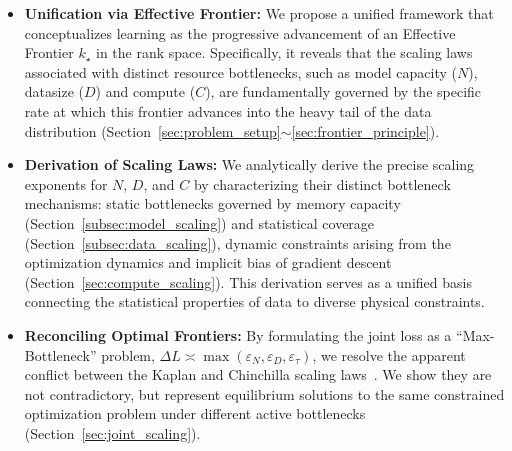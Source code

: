 \documentclass{article}
\theoremstyle{plain}
\theoremstyle{definition}
\theoremstyle{remark}
\begin{document}
\begin{itemize}
    \item \textbf{Unification via Effective Frontier:} 
    We propose a unified framework that conceptualizes learning as the progressive advancement of an Effective Frontier $k_\star$ in the rank space. Specifically, it reveals that the scaling laws associated with distinct resource bottlenecks, such as model capacity ($N$), datasize ($D$) and compute ($C$), are fundamentally governed by the specific rate at which this frontier advances into the heavy tail of the data distribution (Section~\ref{sec:problem_setup}$\sim$\ref{sec:frontier_principle}).
    \item \textbf{Derivation of Scaling Laws:} We analytically derive the precise scaling exponents for $N$, $D$, and $C$ by characterizing their distinct bottleneck mechanisms: static bottlenecks governed by memory capacity (Section~\ref{subsec:model_scaling}) and statistical coverage (Section~\ref{subsec:data_scaling}), dynamic constraints arising from the optimization dynamics and implicit bias of gradient descent (Section~\ref{sec:compute_scaling}).
    This derivation serves as a unified basis connecting the statistical properties of data to diverse physical constraints.
    \item \textbf{Reconciling Optimal Frontiers:} By formulating the joint loss as a ``Max-Bottleneck'' problem, $\Delta L \asymp \max(\varepsilon_N, \varepsilon_D, \varepsilon_\tau)$, we resolve the apparent conflict between the Kaplan and Chinchilla scaling laws~\citep{kaplan2020scalinglawsneurallanguage, hoffmann2022trainingcomputeoptimallargelanguage}. We show they are not contradictory, but represent equilibrium solutions to the same constrained optimization problem under different active bottlenecks (Section~\ref{sec:joint_scaling}).
\end{itemize}
\end{document}
